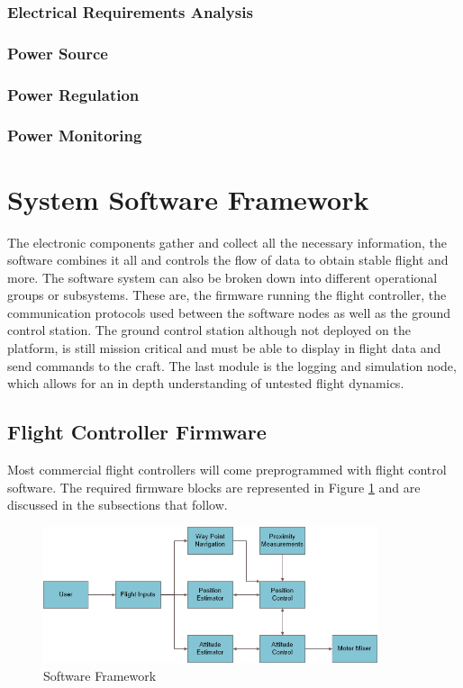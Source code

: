 				\subsubsection{Electrical Requirements Analysis}
				\subsubsection{Power Source}
				\subsubsection{Power Regulation}
				\subsubsection{Power Monitoring}
				
	\section{System Software Framework}
	The electronic components gather and collect all the necessary information, the software combines it all and controls the flow of data to obtain stable flight and more. The software system can also be broken down into different operational groups or subsystems. These are, the firmware running the flight controller, the communication protocols used between the software nodes as well as the ground control station. The ground control station although not deployed on the platform, is still mission critical and must be able to display in flight data and send commands to the craft. The last module is the logging and simulation node, which allows for an in depth understanding of untested flight dynamics.
	
		\subsection{Flight Controller Firmware}
		Most commercial flight controllers will come preprogrammed with flight control software. The required firmware blocks are represented in Figure \ref{IM_SoftwareArchitecture} and are discussed in the subsections that follow.
		
		\begin{figure}[H]
			\centering
			\includegraphics[height = 4cm]{../Design/Software/FirmwareBlocks}
			\caption{Software Framework}
			\label{IM_SoftwareArchitecture}
		\end{figure}
		

